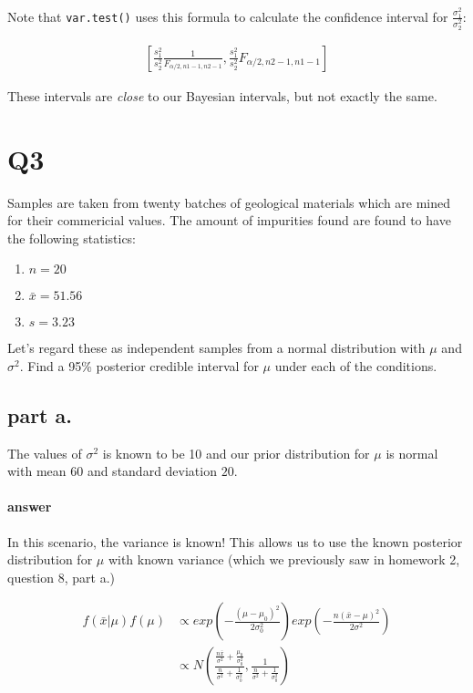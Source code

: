 \documentclass[12pt,a4paper]{article}
\begin{document}
Note that \texttt{var.test()} uses this formula to calculate the confidence interval for $\frac{\sigma^2_1}{\sigma^2_2}$:

\begin{align*}
\left[ \frac{s_1^2}{s_2^2}\frac{1}{F_{\alpha/2, n1-1, n2-1}}, \frac{s_1^2}{s_2^2}F_{\alpha/2, n2-1, n1-1} \right] 
\end{align*}

These intervals are \textit{close} to our Bayesian intervals, but not exactly the same.

\section{Q3}
Samples are taken from twenty batches of geological materials which are mined for their commericial values.
The amount of impurities found are found to have the following statistics:

\begin{enumerate}
	\item $n = 20$
	\item $\bar{x} = 51.56$
	\item $s = 3.23$
\end{enumerate}

Let's regard these as independent samples from a normal distribution with $\mu$ and $\sigma^2$.
Find a 95\% posterior credible interval for $\mu$ under each of the conditions.

\subsection{part a.}
The values of $\sigma^2$ is known to be 10 and our prior distribution for $\mu$ is normal with mean $60$ and standard deviation $20$.

\paragraph{answer}
In this scenario, the variance is known!
This allows us to use the known posterior distribution for $\mu$ with known variance (which we previously saw in homework 2, question 8, part a.)

\begin{align*}
	f(\bar{x} | \mu) f(\mu) &\propto exp\left(-\frac{(\mu - \mu_0)^2}{2\sigma_0^2}\right) exp \left(-\frac{n(\bar{x} - \mu)^2}{2\sigma^2}\right) \\
							&\propto N\left(\frac{\frac{n\bar{x}}{\sigma^2} + \frac{\mu_0}{\sigma_0^2}}{\frac{n}{\sigma^2} + \frac{1}{\sigma_0^2}}, \frac{1}{\frac{n}{\sigma^2} + \frac{1}{\sigma^2_0}}\right)
\end{align*}
\end{document}
